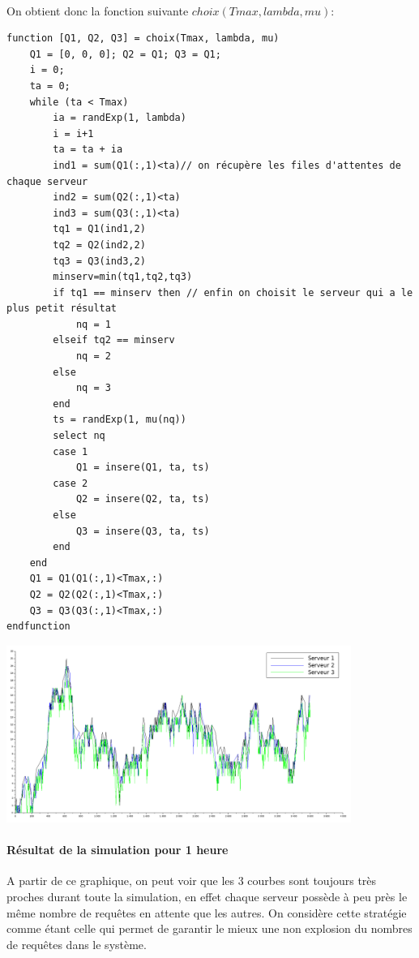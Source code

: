 \documentclass{article}
\begin{document}
\paragraph{}On obtient donc la fonction suivante $choix(Tmax,lambda,mu)$:
\begin{verbatim}
function [Q1, Q2, Q3] = choix(Tmax, lambda, mu)
    Q1 = [0, 0, 0]; Q2 = Q1; Q3 = Q1;
    i = 0;
    ta = 0; 
    while (ta < Tmax)
        ia = randExp(1, lambda)
        i = i+1 
        ta = ta + ia 
        ind1 = sum(Q1(:,1)<ta)// on récupère les files d'attentes de chaque serveur
        ind2 = sum(Q2(:,1)<ta)
        ind3 = sum(Q3(:,1)<ta)
        tq1 = Q1(ind1,2)
        tq2 = Q2(ind2,2)
        tq3 = Q3(ind3,2)
        minserv=min(tq1,tq2,tq3)
        if tq1 == minserv then // enfin on choisit le serveur qui a le plus petit résultat
            nq = 1
        elseif tq2 == minserv
            nq = 2
        else
            nq = 3
        end
        ts = randExp(1, mu(nq))
        select nq 
        case 1 
            Q1 = insere(Q1, ta, ts)
        case 2 
            Q2 = insere(Q2, ta, ts)
        else
            Q3 = insere(Q3, ta, ts)
        end
    end
    Q1 = Q1(Q1(:,1)<Tmax,:)
    Q2 = Q2(Q2(:,1)<Tmax,:)
    Q3 = Q3(Q3(:,1)<Tmax,:)
endfunction
\end{verbatim}

\begin{center}
	\includegraphics[width=425px]{img/choix.png}
\end{center}
\paragraph{Résultat de la simulation pour 1 heure} A partir de ce graphique, on peut voir que les 3 courbes sont toujours très proches durant toute la simulation, en effet chaque serveur possède à peu près le même nombre de requêtes en attente que les autres. On considère cette stratégie comme étant celle qui permet de garantir le mieux une non explosion du nombres de requêtes dans le système.
\end{document}
